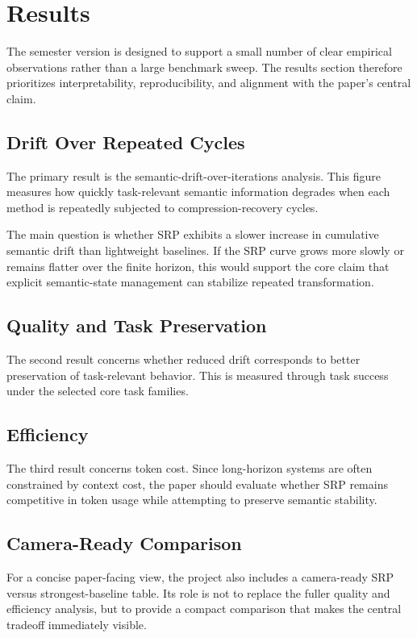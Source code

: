 \documentclass{article}
\begin{document}
\section{Results}
The semester version is designed to support a small number of clear empirical observations rather than a large benchmark sweep. The results section therefore prioritizes interpretability, reproducibility, and alignment with the paper's central claim.

\subsection{Drift Over Repeated Cycles}

The primary result is the semantic-drift-over-iterations analysis. This figure measures how quickly task-relevant semantic information degrades when each method is repeatedly subjected to compression-recovery cycles.

The main question is whether SRP exhibits a slower increase in cumulative semantic drift than lightweight baselines. If the SRP curve grows more slowly or remains flatter over the finite horizon, this would support the core claim that explicit semantic-state management can stabilize repeated transformation.

\subsection{Quality and Task Preservation}

The second result concerns whether reduced drift corresponds to better preservation of task-relevant behavior. This is measured through task success under the selected core task families.

\subsection{Efficiency}

The third result concerns token cost. Since long-horizon systems are often constrained by context cost, the paper should evaluate whether SRP remains competitive in token usage while attempting to preserve semantic stability.

\subsection{Camera-Ready Comparison}

For a concise paper-facing view, the project also includes a camera-ready SRP versus strongest-baseline table. Its role is not to replace the fuller quality and efficiency analysis, but to provide a compact comparison that makes the central tradeoff immediately visible.
\end{document}
